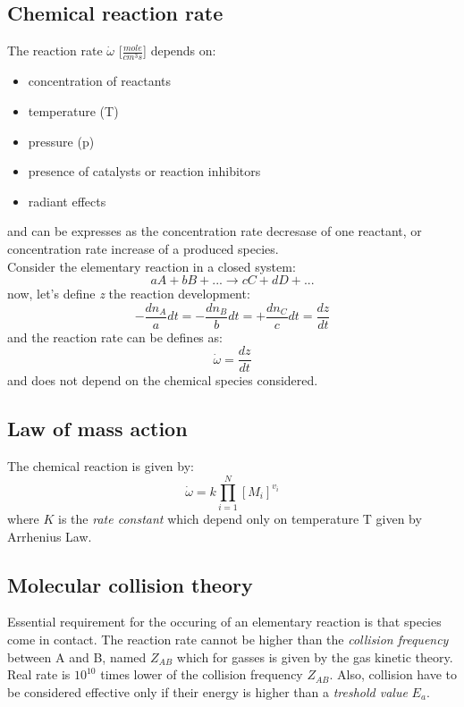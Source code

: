\documentclass[12pt]{article}
\begin{document}
\subsection{Chemical reaction rate}

The reaction rate \textbf{$\dot{\omega}$} [$\frac{mole}{cm^{3}s}$] depends on:
\begin{itemize}
    \item concentration of reactants
    \item temperature (T)
    \item pressure (p)
    \item presence of catalysts or reaction inhibitors
    \item radiant effects
\end{itemize}
and can be expresses as the concentration rate decresase of one reactant, or concentration rate increase of a produced species.\\
Consider the elementary reaction in a closed system:
\begin{equation}
    aA+bB+... \rightarrow cC+dD+...
\end{equation}
now, let's define \textit{z} the reaction development:
\begin{equation}
    -\frac{dn_{A}}{a}dt =
    -\frac{dn_{B}}{b}dt =
    +\frac{dn_{C}}{c}dt =
    \frac{dz}{dt}
\end{equation}
and the reaction rate can be defines as:
\begin{equation}
    \dot{\omega} = \frac{dz}{dt}
\end{equation}
and does not depend on the chemical species considered.

\subsection{Law of mass action}

The chemical reaction is given by:
\begin{equation}
    \dot{\omega} = k \prod_{i=1}^{N}[M_{i}]^{v_{i}}
\end{equation}
where $K$ is the \textit{rate constant} which depend only on temperature T given by Arrhenius Law.

\subsection{Molecular collision theory}

Essential requirement for the occuring of an elementary reaction is that species come in contact. The reaction rate cannot be higher than the \textit{collision frequency} between A and B, named \textbf{$Z_{AB}$} which for gasses is given by the gas kinetic theory.\\
Real rate is $10^{10}$ times lower of the collision frequency $Z_{AB}$. Also, collision have to be considered effective only if their energy is higher than a \textit{treshold value} \textit{$E_{a}$}.
\end{document}

